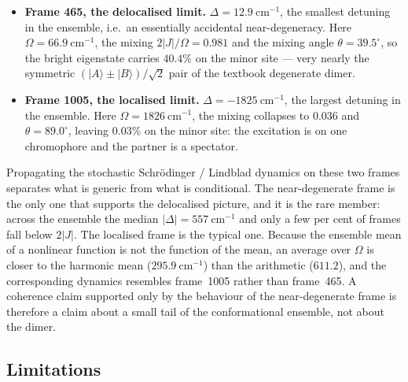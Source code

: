 \documentclass[journal=jpcbfk, manuscript=article, layout=twocolumn, doi=true]{achemso}
\begin{document}
\begin{itemize}
\item \textbf{Frame 465, the delocalised limit.} $\Delta = 12.9~\mathrm{cm^{-1}}$,
      the smallest detuning in the ensemble, i.e.\ an essentially accidental
      near-degeneracy. Here $\Omega = 66.9~\mathrm{cm^{-1}}$, the mixing
      $2|J|/\Omega = 0.981$ and the mixing angle $\theta = 39.5^\circ$, so the
      bright eigenstate carries $40.4\%$ on the minor site --- very nearly the
      symmetric $\left(|A\rangle \pm |B\rangle\right)/\sqrt{2}$ pair of the
      textbook degenerate dimer.
\item \textbf{Frame 1005, the localised limit.} $\Delta = -1825~\mathrm{cm^{-1}}$,
      the largest detuning in the ensemble. Here $\Omega = 1826~\mathrm{cm^{-1}}$,
      the mixing collapses to $0.036$ and $\theta = 89.0^\circ$, leaving
      $0.03\%$ on the minor site: the excitation is on one chromophore and the
      partner is a spectator.
\end{itemize}

Propagating the stochastic Schr\"odinger / Lindblad dynamics on these two frames
separates what is generic from what is conditional. The near-degenerate frame is
the only one that supports the delocalised picture, and it is the rare member:
across the ensemble the median $|\Delta| = 557~\mathrm{cm^{-1}}$ and only a few
per cent of frames fall below $2|J|$. The localised frame is the typical one.
Because the ensemble mean of a nonlinear function is not the function of the
mean, an average over $\Omega$ is closer to the harmonic mean
($295.9~\mathrm{cm^{-1}}$) than the arithmetic ($611.2$), and the corresponding
dynamics resembles frame~1005 rather than frame~465. A coherence claim
supported only by the behaviour of the near-degenerate frame is therefore a
claim about a small tail of the conformational ensemble, not about the dimer.

\subsection{Limitations}
\label{sec:limitations}
\end{document}
